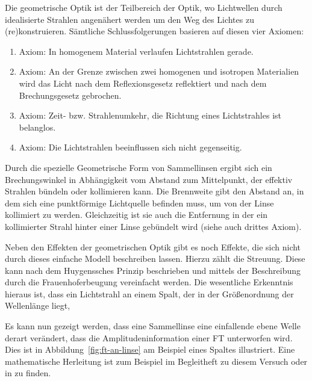 
Die geometrische Optik ist der Teilbereich der Optik, wo Lichtwellen durch idealisierte Strahlen angenähert werden um den Weg des Lichtes zu (re)konstruieren. Sämtliche Schlussfolgerungen basieren auf diesen vier Axiomen:

\begin{enumerate}
	\item{Axiom:} In homogenem Material verlaufen Lichtstrahlen gerade.
	\item{Axiom:} An der Grenze zwischen zwei homogenen und isotropen Materialien wird das Licht nach dem Reflexionsgesetz reflektiert und nach dem Brechungsgesetz gebrochen.
	\item{Axiom:} Zeit- bzw. Strahlenumkehr, die Richtung eines Lichtstrahles ist belanglos.
	\item{Axiom:} Die Lichtstrahlen beeinflussen sich nicht gegenseitig.
\end{enumerate}

Durch die spezielle Geometrische Form von Sammellinsen ergibt sich ein Brechungswinkel in Abhängigkeit vom Abstand zum Mittelpunkt, der effektiv Strahlen bündeln oder kollimieren kann. Die Brennweite gibt den Abstand an, in dem sich eine punktförmige Lichtquelle befinden muss, um von der Linse kollimiert zu werden. Gleichzeitig ist sie auch die Entfernung in der ein kollimierter Strahl hinter einer Linse gebündelt wird (siehe auch drittes Axiom).

Neben den Effekten der geometrischen Optik gibt es noch Effekte, die sich nicht durch dieses einfache Modell beschreiben lassen. Hierzu zählt die Streuung. Diese kann nach dem Huygenssches Prinzip\cite{} beschrieben und mittels der Beschreibung durch die Frauenhoferbeugung\cite{} vereinfacht werden. Die wesentliche Erkenntnis hieraus ist, dass ein Lichtstrahl an einem Spalt, der in der Größenordnung der Wellenlänge liegt,

Es kann nun gezeigt werden, dass eine Sammellinse eine einfallende ebene Welle derart verändert, dass die Amplitudeninformation einer FT unterworfen wird. Dies ist in Abbildung~\ref{fig:ft-an-linse} am Beispiel eines Spaltes illustriert. Eine mathematische Herleitung ist zum Beispiel im Begleitheft zu diesem Versuch oder in \cite{bibid} zu finden.

